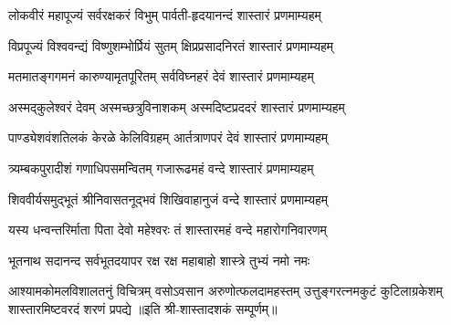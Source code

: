 
\twolineshloka
{लोकवीरं महापूज्यं सर्वरक्षकरं विभुम्}
{पार्वती-हृदयानन्दं शास्तारं प्रणमाम्यहम्}

\twolineshloka
{विप्रपूज्यं विश्ववन्द्यं विष्णुशम्भोर्प्रियं सुतम्}
{क्षिप्रप्रसादनिरतं शास्तारं प्रणमाम्यहम्}

\twolineshloka
{मतमातङ्गगमनं कारुण्यामृतपूरितम्}
{सर्वविघ्नहरं देवं शास्तारं प्रणमाम्यहम्}

\twolineshloka
{अस्मद्कुलेश्वरं देवम् अस्मच्छत्रुविनाशकम्}
{अस्मदिष्टप्रददरं शास्तारं प्रणमाम्यहम्}

\twolineshloka
{पाण्ड्येशवंशतिलकं केरळे केलिविग्रहम्}
{आर्तत्राणपरं देवं शास्तारं प्रणमाम्यहम्}

\twolineshloka
{त्र्यम्बकपुरादीशं गणाधिपसमन्वितम्}
{गजारूढमहं वन्दे शास्तारं प्रणमाम्यहम्}

\twolineshloka
{शिववीर्यसमुद्भूतं श्रीनिवासतनूद्भवं}
{शिखिवाहानुजं वन्दे शास्तारं प्रणमाम्यहम्}

\twolineshloka
{यस्य धन्वन्तरिर्माता पिता देवो महेश्वरः}
{तं शास्तारमहं वन्दे महारोगनिवारणम्}

\twolineshloka
{भूतनाथ सदानन्द सर्वभूतदयापर}
{रक्ष रक्ष महाबाहो शास्त्रे तुभ्यं नमो नमः}

\fourlineindentedshloka
{आश्यामकोमलविशालतनुं विचित्रम्}
{वसोऽवसान अरुणोत्फलदामहस्तम्}
{उत्तुङ्गरत्नमकुटं कुटिलाग्रकेशम्}
{शास्तारमिष्टवरदं शरणं प्रपद्ये}
॥इति श्री-शास्तादशकं सम्पूर्णम्॥